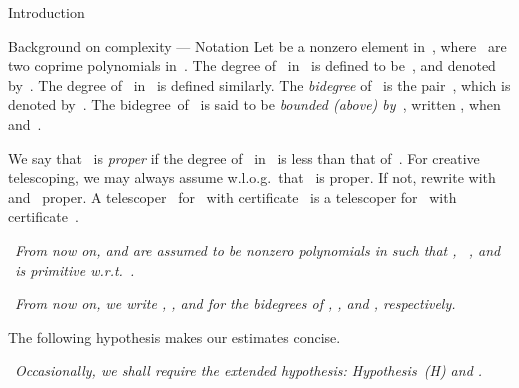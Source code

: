 \documentclass{sig-alt-full}
\begin{document}
\begin{section}{Introduction}
\begin{subsection}{Background on complexity --- Notation}
Let  be a nonzero element in~, where~ are two
coprime polynomials in~. The degree of~ in~ is
defined to be~, and denoted
by~. The degree of~ in~ is defined similarly. The
\emph{bidegree\/} of~ is the pair~, which
is denoted by~. The bidegree~of~ is said to be
\emph{bounded (above) by~}, written
, when~
and~.

We say that~ is \emph{proper\/} if the degree of~ in~ is
less than that of~.
For creative telescoping, we may always assume w.l.o.g.\ that
~is proper. If not, rewrite  with  and ~proper. A telescoper~ for~ with
certificate~ is a telescoper for~ with certificate~.

\medskip{} \ \emph{From now on,  and
 are assumed to be nonzero polynomials in  such that
, \ , and ~is primitive
w.r.t.\ .}

\medskip{} \ \emph{From now on, we write , , and  for the bidegrees of
, , and , respectively.}

\medskip\noindent The following hypothesis makes our estimates
concise.

\medskip{} \ \emph{Occasionally, we shall
require the ex\-tend\-ed hypothesis: Hypothesis~(H) and
.}
\end{subsection}

\end{section}
\end{document}
